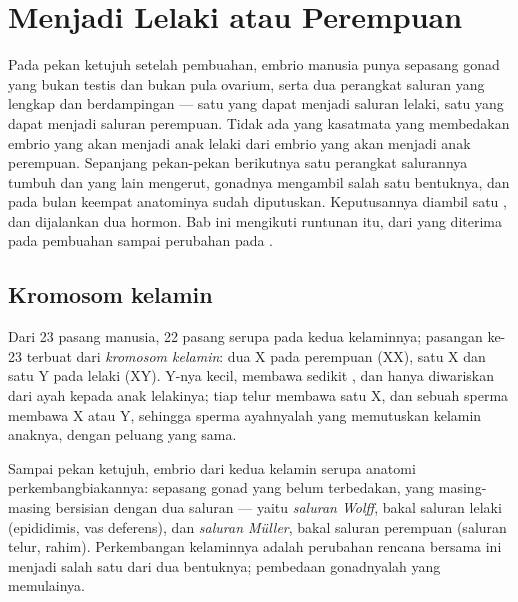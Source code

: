 \chapter{Menjadi Lelaki atau Perempuan}\label{ch:g11:becoming-male-female}

Pada pekan ketujuh setelah pembuahan, embrio manusia punya sepasang
gonad yang bukan testis dan bukan pula ovarium, serta dua perangkat
saluran yang lengkap dan berdampingan --- satu yang dapat menjadi
saluran lelaki, satu yang dapat menjadi saluran perempuan. Tidak ada
yang kasatmata yang membedakan embrio yang akan menjadi anak lelaki
dari embrio yang akan menjadi anak perempuan. Sepanjang pekan-pekan
berikutnya satu perangkat salurannya tumbuh dan yang lain mengerut,
gonadnya mengambil salah satu bentuknya, dan pada bulan keempat
anatominya sudah diputuskan. Keputusannya diambil satu , dan
dijalankan dua hormon. Bab ini mengikuti runtunan itu, dari 
yang diterima pada pembuahan sampai perubahan pada .

\section{Kromosom kelamin}

\begin{definition}\label{def:g11:becoming-male-female:chromosomes}
Dari 23 pasang  manusia, 22 pasang serupa pada kedua kelaminnya;
pasangan ke-23 terbuat dari \emph{kromosom kelamin}:
dua  X pada perempuan (XX), satu X dan satu Y pada lelaki (XY).
Y-nya kecil, membawa sedikit , dan hanya diwariskan dari ayah kepada
anak lelakinya; tiap  telur membawa satu X, dan sebuah sperma
membawa X atau Y, sehingga sperma ayahnyalah yang memutuskan kelamin
 anaknya, dengan peluang yang sama.
\end{definition}

\begin{proposition}\label{prop:g11:becoming-male-female:undifferentiated}
Sampai pekan ketujuh, embrio dari kedua kelamin  serupa
anatomi perkembangbiakannya: sepasang gonad yang belum terbedakan, yang
masing-masing bersisian dengan dua saluran --- yaitu \emph{saluran
Wolff}, bakal saluran lelaki (epididimis, vas deferens), dan
\emph{saluran Müller}, bakal saluran perempuan (saluran telur, rahim).
Perkembangan kelaminnya adalah perubahan rencana bersama ini menjadi
salah satu dari dua bentuknya; pembedaan gonadnyalah yang memulainya.
\end{proposition}
\admitted

